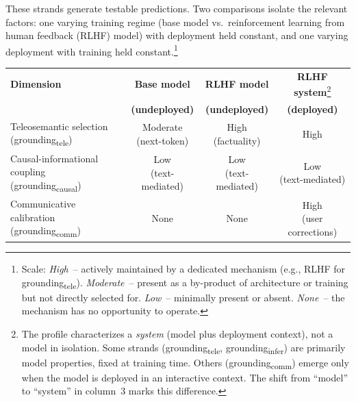 \documentclass[12pt]{article}
\newcommand{\gtele}{grounding\textsubscript{tele}}
\newcommand{\gcausal}{grounding\textsubscript{causal}}
\newcommand{\gcomm}{grounding\textsubscript{comm}}
\newcommand{\ginfer}{grounding\textsubscript{infer}}
\begin{document}
These strands generate testable predictions. Two comparisons isolate the relevant factors: one varying training regime (base model vs.\ reinforcement learning from human feedback (RLHF) model) with deployment held constant, and one varying deployment with training held constant.\footnote{Scale: \emph{High}~-- actively maintained by a dedicated mechanism (e.g., RLHF for \gtele{}). \emph{Moderate}~-- present as a by-product of architecture or training but not directly selected for. \emph{Low}~-- minimally present or absent. \emph{None}~-- the mechanism has no opportunity to operate.}

\begin{table}[ht]
\centering
\small
\begin{tabular}{l@{\hspace{1em}}c@{\hspace{1em}}c@{\hspace{1em}}c}
\hline
\textbf{Dimension} & \textbf{Base model} & \textbf{RLHF model} & \textbf{RLHF system}\protect\footnote{The profile characterizes a \emph{system} (model plus deployment context), not a model in isolation. Some strands (\gtele{}, \ginfer{}) are primarily model properties, fixed at training time. Others (\gcomm{}) emerge only when the model is deployed in an interactive context. The shift from \enquote{model} to \enquote{system} in column~3 marks this difference.} \\
 & \textbf{(undeployed)} & \textbf{(undeployed)} & \textbf{(deployed)} \\
\hline
\shortstack[l]{Teleosemantic selection\\(\gtele{})} & \shortstack{Moderate\\{\scriptsize(next-token)}} & \shortstack{High\\{\scriptsize(factuality)}} & \shortstack{High\\\phantom{}} \\[6pt]
\shortstack[l]{Causal-informational coupling\\(\gcausal{})} & \shortstack{Low\\{\scriptsize(text-mediated)}} & \shortstack{Low\\{\scriptsize(text-mediated)}} & \shortstack{Low\\{\scriptsize(text-mediated)}} \\[6pt]
\shortstack[l]{Communicative calibration\\(\gcomm{})} & \shortstack{None\\\phantom{}} & \shortstack{None\\\phantom{}} & \shortstack{High\\{\scriptsize(user corrections)}} \\[6pt]

\end{tabular}
\end{table}
\end{document}

